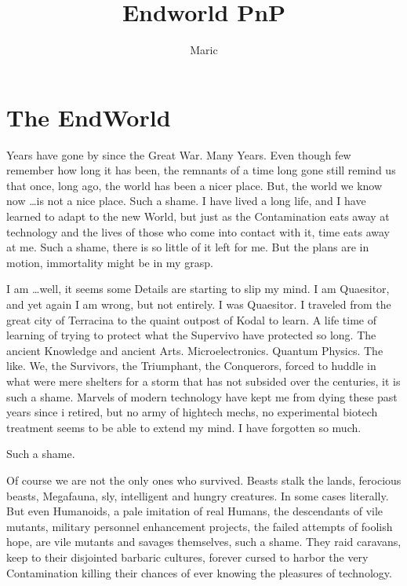 \documentclass[a4paper]{book}
\title{Endworld PnP}
\author{Maric}
\date{}
\begin{document}
    \maketitle
    \tableofcontents
    \chapter{The EndWorld}\label{ch:theendworld}

    Years have gone by since the Great War.
    Many Years.
    Even though few remember how long it has been, the remnants of a time long gone still remind us that once,
    long ago, the world has been a nicer place.
    But, the world we know now \ldots is not a nice place.
    Such a shame.
    I have lived a long life, and I have learned to adapt to the new World,
    but just as the Contamination eats away at technology and the lives of those who come into contact with it, time
    eats away at me.
    Such a shame, there is so little of it left for me.
    But the plans are in motion, immortality might be in my grasp.\par
    I am \ldots well, it seems some Details are starting to slip my mind.
    I am Quaesitor, and yet again I am wrong, but not entirely.
    I was Quaesitor.
    I traveled from the great city of Terracina to the quaint outpost of Kodal to learn.
    A life time of learning of trying to protect what the Supervivo have protected so long.
    The ancient Knowledge and ancient Arts.
    Microelectronics.
    Quantum Physics.
    The like.
    We, the Survivors, the Triumphant, the Conquerors,
    forced to huddle in what were mere shelters for a storm that has not subsided over the centuries,
    it is such a shame.
    Marvels of modern technology have kept me from dying these past years since i retired,
    but no army of hightech mechs, no experimental biotech treatment seems to be able to extend my mind.
    I have forgotten so much.
    \par Such a shame.\par
    Of course we are not the only ones who survived.
    Beasts stalk the lands, ferocious beasts, Megafauna, sly, intelligent and hungry creatures.
    In some cases literally.
    But even Humanoids, a pale imitation of real Humans, the descendants of vile mutants,
    military personnel enhancement projects, the failed attempts of foolish hope,
    are vile mutants and savages themselves, such a shame.
    They raid caravans, keep to their disjointed barbaric cultures,
    forever cursed to harbor the very Contamination killing their chances of ever knowing the pleasures of technology.
\end{document}
